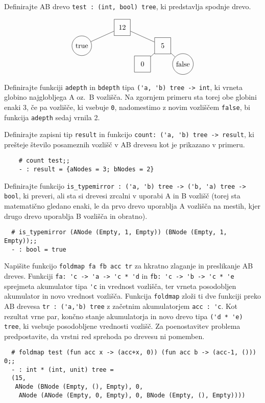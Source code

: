 \documentclass[arhiv]{../izpit}
\begin{document}
  \podnaloga Definirajte AB drevo \verb|test : (int, bool) tree|, ki predstavlja spodnje drevo.
	
	\[
  \begin{tikzpicture}[level distance=0.9cm,
    level 1/.style={sibling distance=4cm},
    level 2/.style={sibling distance=2cm},
    level 3/.style={sibling distance=2cm}
    ]
    \node[minimum size=0.8cm, draw] {12}
      child {node[circle, draw] {true}}
      child {node[minimum size=0.8cm, draw] {5}
        child {node[minimum size=0.8cm, draw] {0}}
        child {node[circle, draw] {false}}
      };
  \end{tikzpicture}
  \]
	
	\podnaloga Definirajte funkciji \verb|adepth| in \verb|bdepth| tipa \verb|('a, 'b) tree -> int|, ki vrneta globino najglobljega A oz.\ B vozlišča. Na zgornjem primeru sta torej obe globini enaki 3, če pa vozlišče, ki vsebuje \verb|0|, nadomestimo z novim vozliščem \verb|false|, bi funkcija \verb|adepth| sedaj vrnila 2.
	
	\podnaloga Definirajte zapisni tip \verb|result| in funkcijo \verb|count: ('a, 'b) tree -> result|, ki prešteje število posameznih vozlišč v AB drevesu kot je prikazano v primeru.
	\begin{verbatim}
	# count test;;
	- : result = {aNodes = 3; bNodes = 2}
	\end{verbatim}
	
	\podnaloga Definirajte funkcijo \verb|is_typemirror : ('a, 'b) tree -> ('b, 'a) tree -> bool|, ki preveri, ali sta si drevesi zrcalni v uporabi A in B vozlišč (torej sta matematično gledano enaki, le da prvo drevo uporablja A vozlišča na mestih, kjer drugo drevo uporablja B vozlišča in obratno).
  \begin{verbatim}
  # is_typemirror (ANode (Empty, 1, Empty)) (BNode (Empty, 1, Empty));;	
  - : bool = true
  \end{verbatim}
    
  \podnaloga Napišite funkcijo \verb|foldmap fa fb acc tr| za hkratno zlaganje in preslikanje AB dreves. Funkciji \verb|fa: 'c -> 'a -> 'c * 'd| in \verb|fb: 'c -> 'b -> 'c * 'e| sprejmeta akumulator tipa \verb|'c| in vrednost vozlišča, ter vrneta posodobljen akumulator in novo vrednost vozlišča. Funkcija \verb|foldmap| zloži ti dve funkciji preko AB drevesa \verb|tr : ('a,'b) tree| z začetnim akumulatorjem \verb|acc : 'c|. Kot rezultat vrne par, končno stanje akumulatorja in novo drevo tipa \verb|('d * 'e) tree|, ki vsebuje posodobljene vrednosti vozlišč. Za poenostavitev problema predpostavite, da vrstni red sprehoda po drevesu ni pomemben.
  \begin{verbatim}
  # foldmap test (fun acc x -> (acc+x, 0)) (fun acc b -> (acc-1, ())) 0;;  
  - : int * (int, unit) tree =
  (15, 
   ANode (BNode (Empty, (), Empty), 0,
    ANode (ANode (Empty, 0, Empty), 0, BNode (Empty, (), Empty))))
  \end{verbatim}
\end{document}
